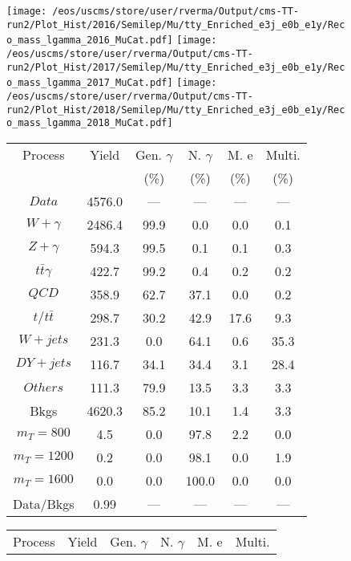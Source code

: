 \begin{figure}
\centering
\texttt{[image: /eos/uscms/store/user/rverma/Output/cms-TT-run2/Plot\_Hist/2016/Semilep/Mu/tty\_Enriched\_e3j\_e0b\_e1y/Reco\_mass\_lgamma\_2016\_MuCat.pdf]}
\texttt{[image: /eos/uscms/store/user/rverma/Output/cms-TT-run2/Plot\_Hist/2017/Semilep/Mu/tty\_Enriched\_e3j\_e0b\_e1y/Reco\_mass\_lgamma\_2017\_MuCat.pdf]}
\texttt{[image: /eos/uscms/store/user/rverma/Output/cms-TT-run2/Plot\_Hist/2018/Semilep/Mu/tty\_Enriched\_e3j\_e0b\_e1y/Reco\_mass\_lgamma\_2018\_MuCat.pdf]}
\begin{minipage}[c]{0.32\textwidth}
\centering
\tiny{
\begin{tabular}{cccccc}
\hline
Process & Yield & Gen. $\gamma$ & N. $\gamma$ & M. e & Multi. \\
 &  & (\%) & (\%) & (\%) & (\%)  \\
\hline
                                                                      $ Data $ &  4576.0 &  --- &  --- &  --- &  ---\\
$ W+\gamma $ &  2486.4 &  99.9 &  0.0 &  0.0 &  0.1\\
$ Z+\gamma $ &  594.3 &  99.5 &  0.1 &  0.1 &  0.3\\
$ t\bar{t}\gamma $ &  422.7 &  99.2 &  0.4 &  0.2 &  0.2\\
$ QCD $ &  358.9 &  62.7 &  37.1 &  0.0 &  0.2\\
$ t/t\bar{t} $ &  298.7 &  30.2 &  42.9 &  17.6 &  9.3\\
$ W+jets $ &  231.3 &  0.0 &  64.1 &  0.6 &  35.3\\
$ DY+jets $ &  116.7 &  34.1 &  34.4 &  3.1 &  28.4\\
$ Others $ &  111.3 &  79.9 &  13.5 &  3.3 &  3.3\\
Bkgs &  4620.3 &  85.2 &  10.1 &  1.4 &  3.3\\
$ m_{T} = 800 $ &  4.5 &  0.0 &  97.8 &  2.2 &  0.0\\
$ m_{T} = 1200 $ &  0.2 &  0.0 &  98.1 &  0.0 &  1.9\\
$ m_{T} = 1600 $ &  0.0 &  0.0 &  100.0 &  0.0 &  0.0\\
Data/Bkgs &  0.99 &  --- &  --- &  --- &  ---\\
\hline
\end{tabular}
}
\end{minipage}
\begin{minipage}[c]{0.32\textwidth}
\centering
\tiny{
\begin{tabular}{cccccc}
\hline
Process & Yield & Gen. $\gamma$ & N. $\gamma$ & M. e & Multi. \\

\end{tabular}}
\end{minipage}
\end{figure}

